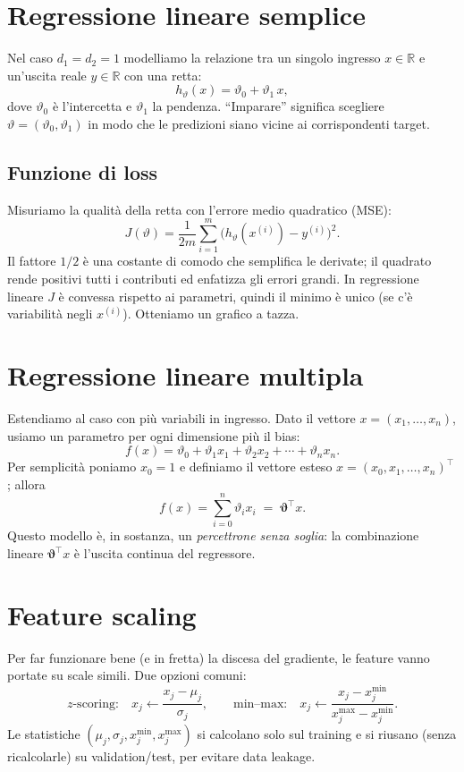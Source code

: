 \section{Regressione lineare semplice}
Nel caso \(d_1=d_2=1\) modelliamo la relazione tra un singolo ingresso \(x\in\mathbb{R}\) e
un'uscita reale \(y\in\mathbb{R}\) con una retta:
\[
h_\vartheta(x)=\vartheta_0+\vartheta_1\,x,
\]
dove \(\vartheta_0\) è l'intercetta e \(\vartheta_1\) la pendenza. ``Imparare'' significa scegliere
\(\vartheta=(\vartheta_0,\vartheta_1)\) in modo che le predizioni siano vicine ai corrispondenti target.

\subsection{Funzione di loss}
Misuriamo la qualità della retta con l'errore medio quadratico (MSE):
\[
J(\vartheta)=\frac{1}{2m}\sum_{i=1}^{m}\big(h_\vartheta(x^{(i)})-y^{(i)}\big)^2.
\]
Il fattore \(1/2\) è una costante di comodo che semplifica le derivate; il quadrato rende
positivi tutti i contributi ed enfatizza gli errori grandi. In regressione lineare \(J\) è
convessa rispetto ai parametri, quindi il minimo è unico (se c'è variabilità negli \(x^{(i)}\)). Otteniamo un grafico a tazza.

\section{Regressione lineare multipla}
Estendiamo al caso con più variabili in ingresso. Dato il vettore
\(x=(x_1,\dots,x_n)\), usiamo un parametro per ogni dimensione più il bias:
\[
f(x)=\vartheta_0+\vartheta_1x_1+\vartheta_2x_2+\cdots+\vartheta_n x_n .
\]
Per semplicità poniamo \(x_0=1\) e definiamo il vettore esteso
\(
x=(x_0,x_1,\dots,x_n)^\top
\);
allora
\[
f(x)=\sum_{i=0}^n \vartheta_i x_i \;=\; \boldsymbol{\vartheta}^\top x.
\]
Questo modello è, in sostanza, un \emph{percettrone senza soglia}: la combinazione lineare
\(\boldsymbol{\vartheta}^\top x\) è l'uscita continua del regressore.

\section{Feature scaling}
Per far funzionare bene (e in fretta) la discesa del gradiente, le feature vanno portate
su scale simili. Due opzioni comuni:
\[
z\text{-scoring:}\quad x_j\leftarrow\frac{x_j-\mu_j}{\sigma_j},
\qquad
\text{min--max:}\quad x_j\leftarrow\frac{x_j-x_j^{\min}}{x_j^{\max}-x_j^{\min}}.
\]
Le statistiche \((\mu_j,\sigma_j,x_j^{\min},x_j^{\max})\) si calcolano solo sul training e
si riusano (senza ricalcolarle) su validation/test, per evitare data leakage.

